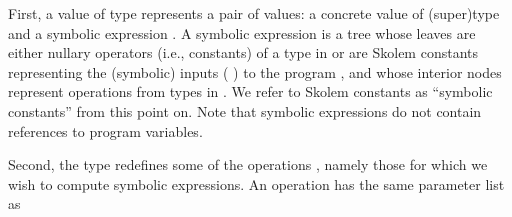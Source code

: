 \documentclass{IOS-Book-Article}
\begin{document}
\begin{mdUl}[class={ul,list-star,loose},elem={ul},data-line={357}]%
\begin{mdLi}[class={li,ul-li,list-star-li,loose-li},label={[(1)]\{.ul-li-label\}},elem={li},data-line={357}]%
\begin{mdP}[data-line={357}]%
{}First, a value of type %
{}%
{} represents a pair of values: 
a concrete value %
{}%
{} of (super)type %
{}%
{} and a symbolic expression %
{}%
{}. 
A symbolic expression is a tree
whose leaves are either nullary operators (i.e., constants) of a type in %
{}%
{}
or are Skolem constants representing the (symbolic) inputs (%
{}%
{})
to the program %
{}%
{}, and whose interior nodes represent operations 
from types in %
{}%
{}. We refer to Skolem constants as %
{}{\textquotedblleft}symbolic constants{\textquotedblright}%
{}
from this point on. Note that symbolic expressions do not contain
references to program variables.%
\end{mdP}%
\end{mdLi}%
\begin{mdLi}[class={li,ul-li,list-star-li,loose-li},label={[(2)]\{.ul-li-label\}},elem={li},data-line={367}]%
\begin{mdP}[data-line={367}]%
{}Second, the type %
{}%
{} redefines some of the operations %
{}%
{},
namely those for which we wish to compute symbolic expressions.
An operation %
{}%
{} has the same parameter list as %
{}%

\end{mdP}
\end{mdLi}
\end{mdUl}
\end{document}
